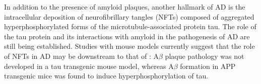 In addition to the presence of amyloid plaques, another hallmark of AD is the intracellular deposition of neurofibrillary tangles (NFTs) composed of aggregated hyperphosphorylated forms of the microtubule-associated protein tau.\cite{Ballatore:2007ir} %
The role of the tau protein and its interactions with amyloid in the pathogenesis of AD are still being established.\cite{Ittner:2010he} Studies with mouse models currently suggest that the role of NFTs in AD may be downstream to that of \abeta: A$\beta$ plaque pathology was not developed in a tau transgenic mouse model, whereas A$\beta$ formation in APP transgenic mice was found to induce hyperphosphorylation of tau.\cite{Gotz:2004dr} 



